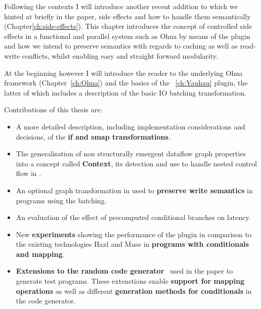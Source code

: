 Following the contexts I will introduce another recent addition to \yauhau{} which we hinted at briefly in the paper, side effects and how to handle them semantically (Chapter\ref{ch:side-effects}).
This chapter introduces the concept of controlled side effects in a functional and parallel system such as Ohua by means of the \yauhau{} plugin and how we intend to preserve semantics with regards to caching as well as read-write conflicts, whilst enabling easy and straight forward modularity.

At the beginning however I will introduce the reader to the underlying Ohua framework (Chapter~\ref{ch:Ohua}) and the basics of the \yauhau{}~\ref{ch:Yauhau} plugin, the latter of which includes a description of the basic IO batching transformation.

Contributions of this thesis are:
\begin{itemize}
    \item A more detailed description, including implementation considerations and decisions, of the \textbf{if and smap transformations}.
    \item The generalisation of non structurally emergent dataflow graph properties into a concept called \textbf{Context}, its detection and use to handle nested control flow in \yauhau{}.
    \item An optional graph transformation in \yauhau{} used to \textbf{preserve write semantics} in programs using the \yauhau{} batching.
    \item An evaluation of the effect of precomputed conditional branches on latency.
    \item New \textbf{experiments} showing the performance of the \yauhau{} plugin in comparison to the existing technologies Haxl and Muse in \textbf{programs with conditionals and mapping}.
    \item \textbf{Extensions to the random code generator}~\cite{Goens-rand-code-graph} used in the \yauhau{} paper to generate test programs.
    These extenstions enable \textbf{support for mapping operations} as well as different \textbf{generation methods for conditionals} in the code generator.
\end{itemize}

